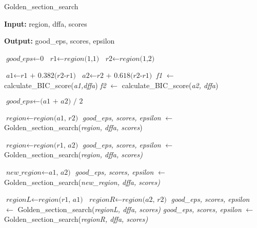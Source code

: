 \documentclass[
a4paper,
12pt
]{scrartcl}
\begin{document}
\begin{algorithm}[H]
\caption{Golden\_section\_search}\label{alg:goldensection}
\begin{algorithmic}[1]
\item \textbf{Input:} region, dffa, scores
\item \textbf{Output:} good\_eps, scores, epsilon

\State $\textit{good\_eps} \gets \textit{0}$
\State $\textit{r1} \gets \textit{region(1,1)}$
\State $\textit{r2} \gets \textit{region(1,2)}$


       \State $\textit{a1} \gets \textit{r1 + 0.382(r2-r1)}$ \label{golden:calcratio}
       \State $\textit{a2} \gets \textit{r2 + 0.618(r2-r1)}$ \label{golden:calcratio2}
       \State \textit{f1} $\gets$ calculate\_BIC\_score(\textit{a1,dffa}) \label{golden:bicscore}
       \State \textit{f2} $\gets$ calculate\_BIC\_score(\textit{a2, dffa}) \label{golden:bicscore2}

          \label{golden:condition}
       \State $\textit{good\_eps} \gets \textit{(a1 + a2) / 2}$   \label{golden:average}
        \State \Return
       \EndIf

        \State $\textit{region} \gets \textit{region(a1, r2)}$
        \State \textit{good\_eps, scores, epsilon} $\gets$ Golden\_section\_search(\textit{region, dffa, scores})
       \State \Return

        \State $\textit{region} \gets \textit{region(r1, a2)}$
        \State \textit{good\_eps, scores, epsilon} $\gets$ Golden\_section\_search(\textit{region, dffa, scores)}
        \State \Return

      \Else
          \label{golden:limit}
        \State \Return
        \EndIf

          \label{golden:maxscores}
        \State $\textit{new\_region} \gets \textit{a1, a2)}$
        \State \textit{good\_eps, scores, epsilon} $\gets$ Golden\_section\_search(\textit{new\_region, dffa, scores)}
        \State \Return

        \Else
          \State $\textit{regionL} \gets \textit{region(r1, a1)}$
          \State $\textit{regionR} \gets \textit{region(a2, r2)}$
        \State \textit{good\_eps, scores, epsilon} $\gets$ Golden\_section\_search(\textit{regionL, dffa, scores)} \label{golden:leftregion}
         \State \textit{good\_eps, scores, epsilon} $\gets$ Golden\_section\_search(\textit{regionR, dffa, scores)} \label{golden:rightregion}
        \State \Return
        \EndIf
       \EndIf

  \EndWhile
\end{algorithmic}
\end{algorithm}
\end{document}
